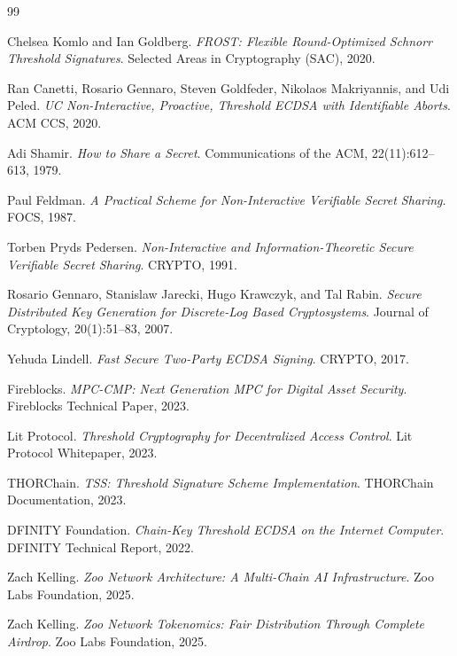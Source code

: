 \documentclass[11pt,letterpaper]{article}
\theoremstyle{definition}
\theoremstyle{remark}
\begin{document}
\begin{thebibliography}{99}

Chelsea Komlo and Ian Goldberg.
\textit{FROST: Flexible Round-Optimized Schnorr Threshold Signatures}.
Selected Areas in Cryptography (SAC), 2020.

Ran Canetti, Rosario Gennaro, Steven Goldfeder, Nikolaos Makriyannis, and Udi Peled.
\textit{UC Non-Interactive, Proactive, Threshold ECDSA with Identifiable Aborts}.
ACM CCS, 2020.

Adi Shamir.
\textit{How to Share a Secret}.
Communications of the ACM, 22(11):612--613, 1979.

Paul Feldman.
\textit{A Practical Scheme for Non-Interactive Verifiable Secret Sharing}.
FOCS, 1987.

Torben Pryds Pedersen.
\textit{Non-Interactive and Information-Theoretic Secure Verifiable Secret Sharing}.
CRYPTO, 1991.

Rosario Gennaro, Stanislaw Jarecki, Hugo Krawczyk, and Tal Rabin.
\textit{Secure Distributed Key Generation for Discrete-Log Based Cryptosystems}.
Journal of Cryptology, 20(1):51--83, 2007.

Yehuda Lindell.
\textit{Fast Secure Two-Party ECDSA Signing}.
CRYPTO, 2017.

Fireblocks.
\textit{MPC-CMP: Next Generation MPC for Digital Asset Security}.
Fireblocks Technical Paper, 2023.

Lit Protocol.
\textit{Threshold Cryptography for Decentralized Access Control}.
Lit Protocol Whitepaper, 2023.

THORChain.
\textit{TSS: Threshold Signature Scheme Implementation}.
THORChain Documentation, 2023.

DFINITY Foundation.
\textit{Chain-Key Threshold ECDSA on the Internet Computer}.
DFINITY Technical Report, 2022.

Zach Kelling.
\textit{Zoo Network Architecture: A Multi-Chain AI Infrastructure}.
Zoo Labs Foundation, 2025.

Zach Kelling.
\textit{Zoo Network Tokenomics: Fair Distribution Through Complete Airdrop}.
Zoo Labs Foundation, 2025.


\end{thebibliography}
\end{document}

